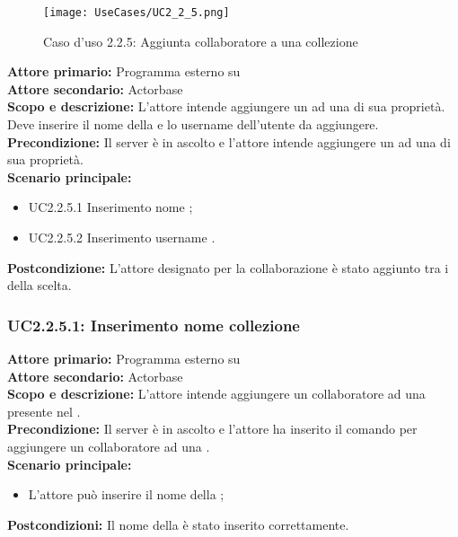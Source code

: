 \documentclass{scalatekids-article}
\begin{document}
\begin{figure}[H]
  \begin{center}
    \texttt{[image: UseCases/UC2\_2\_5.png]}
    \caption*{Caso d'uso 2.2.5: Aggiunta collaboratore a una collezione}
  \end{center}
\end{figure}
\textbf{Attore primario:} Programma esterno su \\
\textbf{Attore secondario:} Actorbase\\
\textbf{Scopo e descrizione:} L'attore intende aggiungere un  ad una  di sua proprietà. Deve inserire il nome della  e lo username dell'utente da aggiungere.\\
\textbf{Precondizione:} Il server è in ascolto e l'attore intende aggiungere un  ad una  di sua proprietà.\\
\textbf{Scenario principale:}
\begin{itemize}
\item UC2.2.5.1 Inserimento nome ;
\item UC2.2.5.2 Inserimento username .
\end{itemize}
\textbf{Postcondizione:} L'attore designato per la collaborazione è stato aggiunto tra i  della  scelta.

\subsubsection{UC2.2.5.1: Inserimento nome collezione}

\textbf{Attore primario:} Programma esterno su \\
\textbf{Attore secondario:} Actorbase\\
\textbf{Scopo e descrizione:} L’attore intende aggiungere un collaboratore ad una  presente nel .\\
\textbf{Precondizione:} Il server è in ascolto e l’attore ha inserito il comando per aggiungere un collaboratore ad una .\\
\textbf{Scenario principale:}
\begin{itemize}
\item L'attore può inserire il nome della ;
\end{itemize}
\textbf{Postcondizioni:} Il nome della  è stato inserito correttamente.
\end{document}

